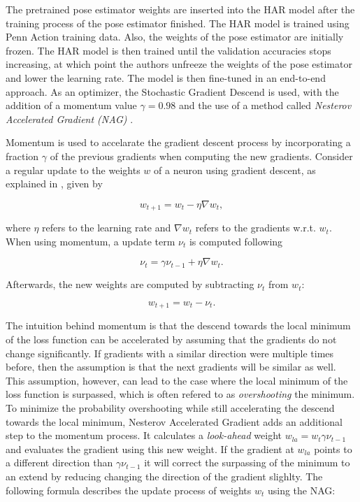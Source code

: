 The pretrained pose estimator weights are inserted into the HAR model after the training process of the pose estimator finished.
The HAR model is trained using Penn Action training data.
Also, the weights of the pose estimator are initially frozen.
The HAR model is then trained until the validation accuracies stops increasing, at which point the authors unfreeze the weights of the pose estimator and lower the learning rate.
The model is then fine-tuned in an end-to-end approach.
As an optimizer, the Stochastic Gradient Descend is used, with the addition of a momentum value $\gamma = 0.98$ and the use of a method called \textit{Nesterov Accelerated Gradient (NAG)} \cite{nesterov_method_1983}.

Momentum is used to accelarate the gradient descent process by incorporating a fraction $\gamma$ of the previous gradients when computing the new gradients.
Consider a regular update to the weights $w$ of a neuron using gradient descent, as explained in , given by

\begin{equation}
    w_{t+1} = w_t - \eta \nabla w_t,
\end{equation}

where $\eta$ refers to the learning rate and $\nabla w_t$ refers to the gradients w.r.t. $w_t$.
When using momentum, a update term $\nu_t$ is computed following

\begin{equation}
    \nu_t = \gamma \nu_{t-1} + \eta \nabla w_t.
\end{equation}

Afterwards, the new weights are computed by subtracting $\nu_t$ from $w_t$:

\begin{equation}
    w_{t+1} = w_t - \nu_t.
\end{equation}

The intuition behind momentum is that the descend towards the local minimum of the loss function can be accelerated by assuming that the gradients do not change significantly.
If gradients with a similar direction were multiple times before, then the assumption is that the next gradients will be similar as well.
This assumption, however, can lead to the case where the local minimum of the loss function is surpassed, which is often refered to as \textit{overshooting} the minimum.
To minimize the probability overshooting while still accelerating the descend towards the local minimum, Nesterov Accelerated Gradient adds an additional step to the momentum process.
It calculates a \textit{look-ahead} weight $w_{la} = w_{t} \gamma \nu_{t-1}$ and evaluates the gradient using this new weight.
If the gradient at $w_{la}$ points to a different direction than $\gamma \nu_{t-1}$ it will correct the surpassing of the minimum to an extend by reducing changing the direction of the gradient slighlty.
The following formula describes the update process of weights $w_t$ using the NAG:

